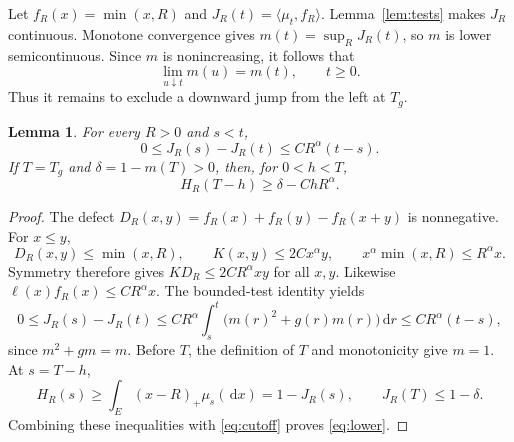 \documentclass[11pt]{article}
\newtheorem{lemma}[theorem]{Lemma}
\newcommand{\pair}[2]{\langle #1,#2\rangle}
\newcommand{\dd}{\,\mathrm{d}}
\begin{document}
Let $f_R(x)=\min(x,R)$ and $J_R(t)=\pair{\mu_t}{f_R}$. Lemma~\ref{lem:tests} makes $J_R$ continuous. Monotone convergence gives $m(t)=\sup_R J_R(t)$, so $m$ is lower semicontinuous. Since $m$ is nonincreasing, it follows that
\begin{equation}\label{eq:right}
 \lim_{u\downarrow t}m(u)=m(t),\qquad t\ge0.
\end{equation}
Thus it remains to exclude a downward jump from the left at $T_g$.

\begin{lemma}\label{lem:cutoff}
For every $R>0$ and $s<t$,
\begin{equation}\label{eq:cutoff}
 0\le J_R(s)-J_R(t)\le CR^\alpha(t-s).
\end{equation}
If $T=T_g$ and $\delta=1-m(T)>0$, then, for $0<h<T$,
\begin{equation}\label{eq:lower}
 H_R(T-h)\ge\delta-ChR^\alpha.
\end{equation}
\end{lemma}
\begin{proof}
The defect $D_R(x,y)=f_R(x)+f_R(y)-f_R(x+y)$ is nonnegative. For $x\le y$,
\[
 D_R(x,y)\le\min(x,R),\qquad K(x,y)\le2Cx^\alpha y,
 \qquad x^\alpha\min(x,R)\le R^\alpha x.
\]
Symmetry therefore gives $KD_R\le2CR^\alpha xy$ for all $x,y$. Likewise $\ell(x)f_R(x)\le CR^\alpha x$. The bounded-test identity yields
\[
 0\le J_R(s)-J_R(t)
 \le CR^\alpha\int_s^t\bigl(m(r)^2+g(r)m(r)\bigr)\dd r
 \le CR^\alpha(t-s),
\]
since $m^2+gm=m$. Before $T$, the definition of $T$ and monotonicity give $m=1$. At $s=T-h$,
\[
 H_R(s)\ge\int_E(x-R)_+\mu_s(\dd x)=1-J_R(s),
 \qquad J_R(T)\le1-\delta.
\]
Combining these inequalities with \eqref{eq:cutoff} proves \eqref{eq:lower}.
\end{proof}
\end{document}
